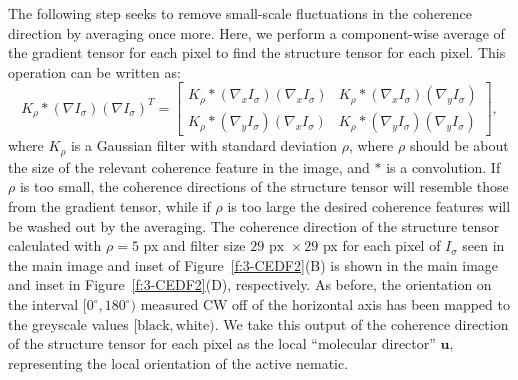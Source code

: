 The following step seeks to remove small-scale fluctuations in the coherence direction by averaging once more.
Here, we perform a component-wise average of the gradient tensor for each pixel to find the structure tensor for each pixel.
This operation can be written as:
\begin{equation}
K_{\rho} \ast (\nabla I_{\sigma})(\nabla I_{\sigma})^T =
\begin{bmatrix}
K_{\rho} \ast ( \nabla_x I_{\sigma})(\nabla_x I_{\sigma}) & K_{\rho} \ast (\nabla_x I_{\sigma})(\nabla_y I_{\sigma}) \\
K_{\rho} \ast (  \nabla_y I_{\sigma})(\nabla_x I_{\sigma}) & K_{\rho} \ast (\nabla_y I_{\sigma})(\nabla_y I_{\sigma})
\end{bmatrix},
\end{equation}
where $K_{\rho}$ is a Gaussian filter with standard deviation $\rho$, where $\rho$ should be about the size of the relevant coherence feature in the image, and $\ast$ is a convolution.
If $\rho$ is too small, the coherence directions of the structure tensor will resemble those from the gradient tensor, while if $\rho$ is too large the desired coherence features will be washed out by the averaging.
The coherence direction of the structure tensor calculated with $\rho = 5$ px and filter size $29\textrm{ px } \times 29$ px for each pixel of $I_{\sigma}$ seen in the main image and inset of Figure~\ref{f:3-CEDF2}(B) is shown in the main image and inset in Figure~\ref{f:3-CEDF2}(D), respectively.
As before, the orientation on the interval $[0^{\circ}, 180^{\circ})$ measured CW off of the horizontal axis has been mapped to the greyscale values $[\textrm{black}, \textrm{white})$.
 We take this output of the coherence direction of the structure tensor for each pixel as the local ``molecular director'' $\mathbf{u}$, representing the local orientation of the active nematic.
\newpage
